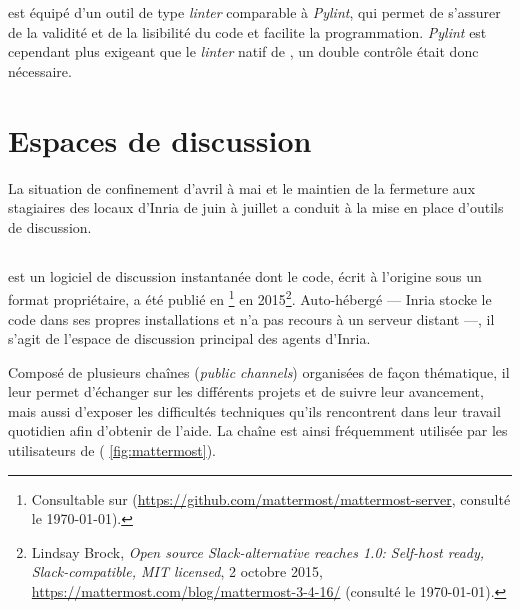 \pycharm{} est équipé d'un outil de type \textit{linter} comparable à \textit{Pylint}, qui permet de s'assurer de la validité et de la lisibilité du code et facilite la programmation. \textit{Pylint} est cependant plus exigeant que le \textit{linter} natif de \pycharm, un double contrôle était donc nécessaire.

\section{Espaces de discussion}

La situation de confinement d'avril à mai et le maintien de la fermeture aux stagiaires des locaux d'Inria de juin à juillet a conduit à la mise en place d'outils de discussion.

\subsection{\Mattermost}

\Mattermost{} est un logiciel de discussion instantanée dont le code, écrit à l'origine sous un format propriétaire, a été publié en \opensource{}\footnote{Consultable sur \github{} (\url{https://github.com/mattermost/mattermost-server}, consulté le \today).} en 2015\footnote{Lindsay Brock, \textit{Open source Slack-alternative reaches 1.0: Self-host ready, Slack-compatible, MIT licensed}, 2 octobre 2015, \url{https://mattermost.com/blog/mattermost-3-4-16/} (consulté le \today).}. Auto-hébergé --- Inria stocke le code dans ses propres installations et n'a pas recours à un serveur distant ---, il s'agit de l'espace de discussion principal des agents d'Inria.

Composé de plusieurs \og chaînes \fg{} (\textit{public channels}) organisées de façon thématique, il leur permet d'échanger sur les différents projets et de suivre leur avancement, mais aussi d'exposer les difficultés techniques qu'ils rencontrent dans leur travail quotidien afin d'obtenir de l'aide. La chaîne \og \ocr \fg{} est ainsi fréquemment utilisée par les utilisateurs de \kraken{} (\fig{} \ref{fig:mattermost}).

